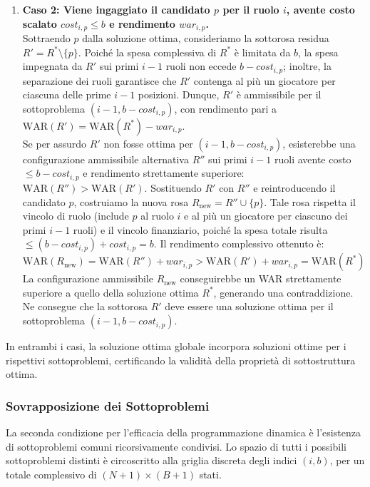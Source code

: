\begin{enumerate}
	\item \textbf{Caso 2: Viene ingaggiato il candidato $p$ per il ruolo $i$, avente costo scalato $\mathit{cost}_{i, p} \le b$ e rendimento $\mathit{war}_{i, p}$.} \\
	      Sottraendo $p$ dalla soluzione ottima, consideriamo la sottorosa residua $R' = R^* \setminus \{p\}$. Poiché la spesa complessiva di $R^*$ è limitata da $b$, la spesa impegnata da $R'$ sui primi $i-1$ ruoli non eccede $b - \mathit{cost}_{i, p}$; inoltre, la separazione dei ruoli garantisce che $R'$ contenga al più un giocatore per ciascuna delle prime $i-1$ posizioni. Dunque, $R'$ è ammissibile per il sottoproblema $(i-1, b - \mathit{cost}_{i, p})$, con rendimento pari a $\text{WAR}(R') = \text{WAR}(R^*) - \mathit{war}_{i, p}$. \\
	      Se per assurdo $R'$ non fosse ottima per $(i-1, b - \mathit{cost}_{i, p})$, esisterebbe una configurazione ammissibile alternativa $R''$ sui primi $i-1$ ruoli avente costo $\le b - \mathit{cost}_{i, p}$ e rendimento strettamente superiore: $\text{WAR}(R'') > \text{WAR}(R')$.
	      Sostituendo $R'$ con $R''$ e reintroducendo il candidato $p$, costruiamo la nuova rosa $R_{\text{new}} = R'' \cup \{p\}$. Tale rosa rispetta il vincolo di ruolo (include $p$ al ruolo $i$ e al più un giocatore per ciascuno dei primi $i-1$ ruoli) e il vincolo finanziario, poiché la spesa totale risulta $\le (b - \mathit{cost}_{i, p}) + \mathit{cost}_{i, p} = b$. Il rendimento complessivo ottenuto è:
	      \[
		      \text{WAR}(R_{\text{new}}) = \text{WAR}(R'') + \mathit{war}_{i, p} > \text{WAR}(R') + \mathit{war}_{i, p} = \text{WAR}(R^*)
	      \]
	      La configurazione ammissibile $R_{\text{new}}$ conseguirebbe un WAR strettamente superiore a quello della soluzione ottima $R^*$, generando una contraddizione. Ne consegue che la sottorosa $R'$ deve essere una soluzione ottima per il sottoproblema $(i-1, b - \mathit{cost}_{i, p})$.
\end{enumerate}
In entrambi i casi, la soluzione ottima globale incorpora soluzioni ottime per i rispettivi sottoproblemi, certificando la validità della proprietà di sottostruttura ottima.

\subsubsection{Sovrapposizione dei Sottoproblemi}
La seconda condizione per l'efficacia della programmazione dinamica è l'esistenza di sottoproblemi comuni ricorsivamente condivisi. Lo spazio di tutti i possibili sottoproblemi distinti è circoscritto alla griglia discreta degli indici $(i, b)$, per un totale complessivo di $(N + 1) \times (B + 1)$ stati.

